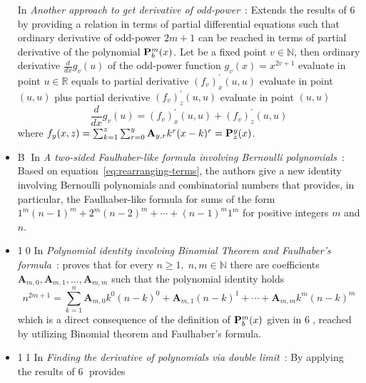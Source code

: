 \begin{itemize}
    In \textit{Another approach to get derivative of odd-power}~\cite{another_approach_to_get_derivative_of_odd_power}:
    Extends the results of {\Large \textcircled{\normalsize 6}} by providing a relation in terms of partial differential equations such that
    ordinary derivative of odd-power $2m+1$ can be reached in terms of partial derivative of the polynomial ${\mathbf{P}}\sp{m} \sb{b}(x)$.
    Let be a fixed point $v\in \mathbb{N}$, then ordinary derivative $\frac{d}{dx} g_v (u)$ of the odd-power function $g_v(x) = x^{2v + 1}$
    evaluate in point $u\in\mathbb{R}$ equals to partial derivative $(f_{v})^{'}_{x} (u, u)$ evaluate in point $(u, u)$ plus
    partial derivative $(f_{v})^{'}_{z} (u, u)$ evaluate in point $(u, u)$
    \begin{equation}
        \frac{d}{dx} g_v (u) = (f_{v})^{'}_{x} (u, u) + (f_{v})^{'}_{z} (u, u)
        \label{eq:odd-exponential-identity}
    \end{equation}
    where $f_{y} (x, z) = \sum_{k=1}^{z} \sum_{r=0}^{y} {\mathbf{A}} \sb{y,r} k^r (x-k)^r = {\mathbf{P}}\sp{y} \sb{z}(x)$.
    \item {\Large \textcircled{\normalsize B}}
    In \textit{A two-sided Faulhaber-like formula involving Bernoulli polynomials}~\cite{barbero2020two}:
    Based on equation~\eqref{eq:rearranging-terms}, the authors give a new identity involving
    Bernoulli polynomials and combinatorial numbers that provides,
    in particular, the Faulhaber-like formula for sums of the form $1^m(n-1)^m + 2^m (n -2)^m + \cdots + (n - 1)^m 1^m$
    for positive integers $m$ and $n$.
    \item {\Large \textcircled{\normalsize 10}}
    In \textit{Polynomial identity involving Binomial Theorem and Faulhaber's formula}~\cite{polynomial_identity_with_binomial_theorem_and_faulhabers_formula}:
    proves that
    for every $n\geq 1, \; n,m\in\mathbb{N}$
    there are coefficients $\mathbf{A}_{m,0}, \mathbf{A}_{m,1}, \ldots, \mathbf{A}_{m,m}$ such that
    the polynomial identity holds
    \[
        n^{2m+1} = \sum_{k=1}^{n} \mathbf{A}_{m,0} k^0 (n-k)^0 + \mathbf{A}_{m,1}(n-k)^1
        + \cdots + \mathbf{A}_{m,m} k^m (n-k)^m
    \]
    which is a direct consequence of the definition of ${\mathbf{P}}\sp{m} \sb{b}(x)$ given in {\Large \textcircled{\normalsize 6}},
    reached by utilizing Binomial theorem and Faulhaber's formula.
    \item {\Large \textcircled{\normalsize 11}}
    In \textit{Finding the derivative of polynomials via double limit}~\cite{derivative_of_polynomials_via_double_limit}:
    By applying the results of {\Large \textcircled{\normalsize 6}} provides

\end{itemize}
